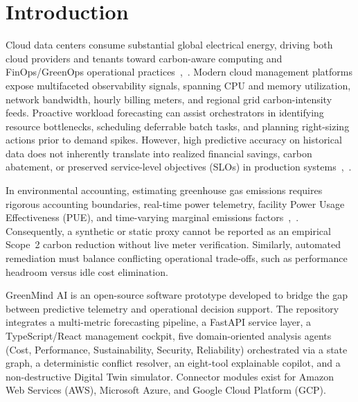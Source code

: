 \documentclass[conference]{IEEEtran}
\begin{document}
\section{Introduction}
Cloud data centers consume substantial global electrical energy, driving both cloud providers and tenants toward carbon-aware computing and FinOps/GreenOps operational practices~\cite{r4},~\cite{r6}. Modern cloud management platforms expose multifaceted observability signals, spanning CPU and memory utilization, network bandwidth, hourly billing meters, and regional grid carbon-intensity feeds. Proactive workload forecasting can assist orchestrators in identifying resource bottlenecks, scheduling deferrable batch tasks, and planning right-sizing actions prior to demand spikes. However, high predictive accuracy on historical data does not inherently translate into realized financial savings, carbon abatement, or preserved service-level objectives (SLOs) in production systems~\cite{r3},~\cite{r8}.

In environmental accounting, estimating greenhouse gas emissions requires rigorous accounting boundaries, real-time power telemetry, facility Power Usage Effectiveness (PUE), and time-varying marginal emissions factors~\cite{r4},~\cite{r5}. Consequently, a synthetic or static proxy cannot be reported as an empirical Scope~2 carbon reduction without live meter verification. Similarly, automated remediation must balance conflicting operational trade-offs, such as performance headroom versus idle cost elimination.

GreenMind AI is an open-source software prototype developed to bridge the gap between predictive telemetry and operational decision support. The repository integrates a multi-metric forecasting pipeline, a FastAPI service layer, a TypeScript/React management cockpit, five domain-oriented analysis agents (Cost, Performance, Sustainability, Security, Reliability) orchestrated via a state graph, a deterministic conflict resolver, an eight-tool explainable copilot, and a non-destructive Digital Twin simulator. Connector modules exist for Amazon Web Services (AWS), Microsoft Azure, and Google Cloud Platform (GCP).
\end{document}
